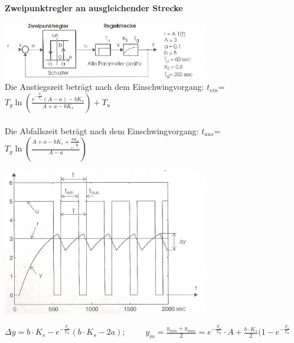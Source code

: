 	\vspace{.5cm}
		\textbf{Zweipunktregler an ausgleichender Strecke } \\
		\begin{minipage}{9cm}
 		\includegraphics[width=9cm]{./bilder/ZweipunktreglerTotglied2.jpg}\\
			Die Anstiegszeit beträgt nach dem Einschwingvorgang:
			$t_{ein}$=$T_g\ln(\frac{e^{-\frac{T_u}{T_g}}(A-a)-b K_s}{A+a-b K_s})+T_u$\\ \\
			Die Abfallszeit beträgt nach dem Einschwingvorgang:
			$t_{aus}$=$T_g\ln(\frac{A+a-b
			K_s+\frac{b K_s}{e^{-\frac{T_u}{T_g}}}}{A-a})$\\
        \end{minipage}
		\begin{minipage}{9cm}
		\includegraphics[width=9cm]{./bilder/ZweipunktreglerTotglied_dia.jpg}			
        \end{minipage}
    
 	$\Delta y = b\cdot K_s - e^{-\frac{T_u}{T_G}}(b\cdot K_s - 2a); \qquad$
	$y_m = \frac{y_{min}+y_{max}}{2}=e^{-\frac{T_u}{T_G}}\cdot A + \frac{b\cdot K_s}{2}(1-e^{-\frac{T_u}{T_G}}$
\newpage


